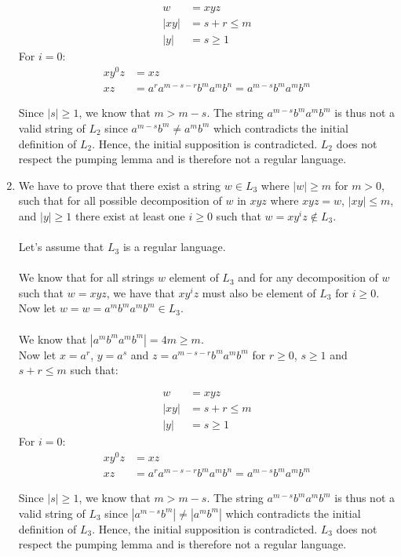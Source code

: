 \begin{enumerate}[label = (\alph*)]
    \begin{align*}
                w &= xyz\\
                |xy| &= s + r \leq m\\ 
                |y| &= s \geq 1
            \end{align*}
            \noindent For $i = 0$:\\
            \begin{align*}
                xy^0z &= xz \\
                xz &= a^ra^{m-s-r}b^ma^mb^n = a^{m - s}b^ma^mb^m
            \end{align*}
            
    \noindent Since $|s| \geq 1$, we  know that $m > m - s$. The string $a^{m-s}b^ma^mb^m$ is thus not a valid string of $L_2$ since $a^{m-s}b^m \neq a^mb^m$ which contradicts the initial definition of $L_2$. Hence, the initial supposition is contradicted. $L_2$ does not respect the pumping lemma and is therefore not a regular language.
    
    \item We have to prove that there exist a string $w \in L_3$ where $|w| \geq m$ for $m > 0$, such that for all possible decomposition of $w$ in $xyz$ where $xyz = w$, $|xy| \leq m$, and $|y| \geq 1$ there exist at least one $i \geq 0$ such that $w = xy^iz \notin L_3$.\\ \\
    Let's assume that $L_3$ is a regular language.\\ \\
    We  know that for all strings $w$ element of $L_3$ and for any decomposition of $w$ such that $w = xyz$, we have that $xy^iz$ must also be element of $L_3$ for $i \geq 0$.
    Now let $w = w = a^mb^ma^mb^m \in L_3$. \\ \\
    We know that $|a^mb^ma^mb^m| = 4m \geq m$. \\
    Now let $x = a^r$, $y = a^s$ and $z = a^{m- s - r}b^ma^mb^m$ for $r \geq 0$, $s \geq 1$ and $s + r \leq m$ such that:
    
    \begin{align*}
                w &= xyz\\
                |xy| &= s + r \leq m\\ 
                |y| &= s \geq 1
            \end{align*}
            \noindent For $i = 0$:\\
            \begin{align*}
                xy^0z &= xz \\
                xz &= a^ra^{m-s-r}b^ma^mb^n = a^{m - s}b^ma^mb^m
            \end{align*}
            
    \noindent Since $|s| \geq 1$, we  know that $m > m - s$. The string $a^{m-s}b^ma^mb^m$ is thus not a valid string of $L_3$ since $|a^{m-s}b^m| \neq |a^mb^m|$ which contradicts the initial definition of $L_3$. Hence, the initial supposition is contradicted. $L_3$ does not respect the pumping lemma and is therefore not a regular language.
    
\end{enumerate}